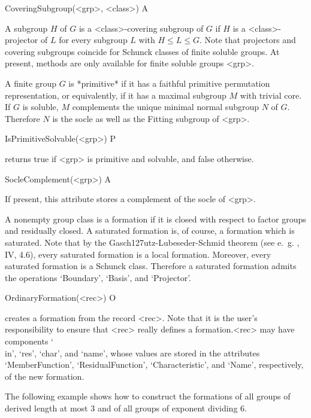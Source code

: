 \>CoveringSubgroup(<grp>, <class>) A

A subgroup $H$ of $G$ is a <class>-covering subgroup of $G$ if $H$ is a
<class>-projector of $L$ for every subgroup $L$ with $H \leq L \leq G$.
Note that projectors and covering subgroups coincide for Schunck classes of
finite soluble groups. At present, methods are only available for finite
soluble groups <grp>.




A finite group $G$ is *primitive* if it has a faithful primitive permutation 
representation, or equivalently, if it has a maximal subgroup $M$ with trivial 
core. If $G$ is soluble, $M$ complements the unique minimal normal subgroup $N$
of $G$. Therefore $N$ is the socle as well as the Fitting subgroup of <grp>.


\>IsPrimitiveSolvable(<grp>) P

returns true if <grp> is primitive and solvable, and false otherwise.


\>SocleComplement(<grp>) A

If present, this attribute stores a complement of the socle of <grp>.



A nonempty group class is a  formation if it is closed with respect to factor
groups and residually closed. A saturated formation is, of course, a
formation which is saturated. Note that by the
Gasch\accent127utz-Lubeseder-Schmid theorem (see e.~g. \cite{DH1992}, IV,
4.6), every saturated formation is a local formation. Moreover, every
saturated formation is a Schunck class. Therefore a saturated formation
admits the operations `Boundary', `Basis', and `Projector'.


\>OrdinaryFormation(<rec>) O

creates a formation from the record <rec>. Note that it is the user's responsibility to ensure that <rec> really
defines a formation.<rec> may have components `\\in',
`res', `char', and `name', whose values are stored in the attributes
`MemberFunction', `ResidualFunction', `Characteristic', and
`Name', respectively, of the new formation.

The following example shows how to construct the formations of all groups of 
derived length at most $3$ and of all groups of exponent dividing $6$.

